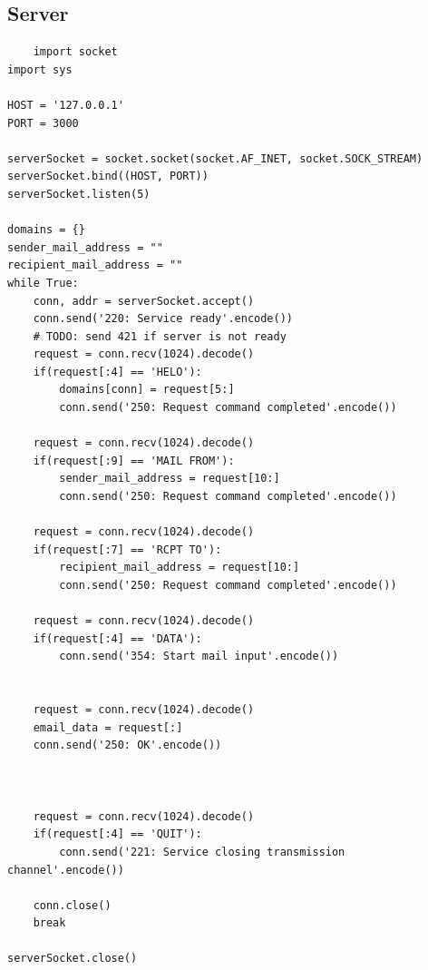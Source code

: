 \documentclass[a4paper,12pt]{article}
\begin{document}
\subsection{Server}
\begin{verbatim}
    import socket
import sys

HOST = '127.0.0.1'
PORT = 3000

serverSocket = socket.socket(socket.AF_INET, socket.SOCK_STREAM)
serverSocket.bind((HOST, PORT))
serverSocket.listen(5)

domains = {}
sender_mail_address = ""
recipient_mail_address = ""
while True:
    conn, addr = serverSocket.accept()
    conn.send('220: Service ready'.encode())
    # TODO: send 421 if server is not ready
    request = conn.recv(1024).decode()
    if(request[:4] == 'HELO'):
        domains[conn] = request[5:]
        conn.send('250: Request command completed'.encode())
    
    request = conn.recv(1024).decode()
    if(request[:9] == 'MAIL FROM'):
        sender_mail_address = request[10:]
        conn.send('250: Request command completed'.encode())

    request = conn.recv(1024).decode()
    if(request[:7] == 'RCPT TO'):
        recipient_mail_address = request[10:]
        conn.send('250: Request command completed'.encode())    
  
    request = conn.recv(1024).decode()
    if(request[:4] == 'DATA'):
        conn.send('354: Start mail input'.encode())  


    request = conn.recv(1024).decode()
    email_data = request[:]
    conn.send('250: OK'.encode())  
    

    
    request = conn.recv(1024).decode()
    if(request[:4] == 'QUIT'):
        conn.send('221: Service closing transmission channel'.encode()) 

    conn.close()
    break

serverSocket.close()


\end{verbatim}
\end{document}
